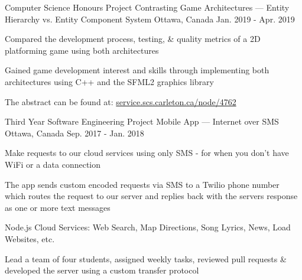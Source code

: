 
\begin{cventries}
	\cventry
		{Computer Science Honours Project}
		{Contrasting Game Architectures --- Entity Hierarchy vs. Entity Component System}
		{Ottawa, Canada}
		{Jan. 2019 - Apr. 2019}
		{\begin{cvitems}
			\item Compared the development process, testing, \& quality metrics of a 2D platforming game using both architectures
			\item Gained game development interest and skills through implementing both architectures using C++ and the SFML2 graphics library
			\item The abstract can be found at: \href{https://service.scs.carleton.ca/node/4762}{service.scs.carleton.ca/node/4762}
		\end{cvitems}}

	\cventry
		{Third Year Software Engineering Project}
		{Mobile App --- Internet over SMS}
		{Ottawa, Canada}
		{Sep. 2017 - Jan. 2018}
		{\begin{cvitems}
			\item Make requests to our cloud services using only SMS - for when you don't have WiFi or a data connection
			\item The app sends custom encoded requests via SMS to a Twilio phone number which routes the request to our server and replies back with the servers response as one or more text messages
			\item Node.js Cloud Services: Web Search, Map Directions, Song Lyrics, News, Load Websites, etc.
			\item Lead a team of four students, assigned weekly tasks, reviewed pull requests \& developed the server using a custom transfer protocol
		\end{cvitems}}
\end{cventries}